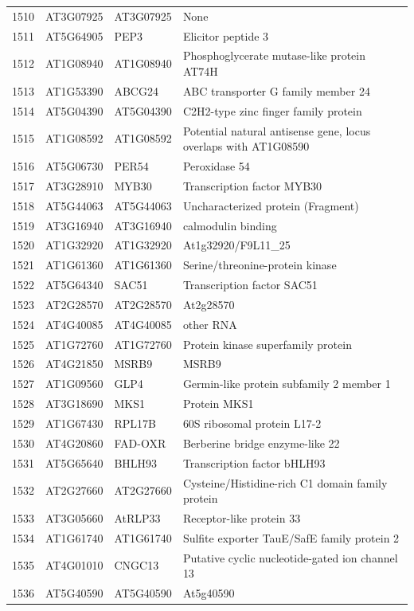 \documentclass[11pt]{article}
\begin{document}
\begin{center}
\begin{tabular}{rlll}
1510 & AT3G07925 & AT3G07925 & None\\
1511 & AT5G64905 & PEP3 & Elicitor peptide 3\\
1512 & AT1G08940 & AT1G08940 & Phosphoglycerate mutase-like protein AT74H\\
1513 & AT1G53390 & ABCG24 & ABC transporter G family member 24\\
1514 & AT5G04390 & AT5G04390 & C2H2-type zinc finger family protein\\
1515 & AT1G08592 & AT1G08592 & Potential natural antisense gene, locus overlaps with AT1G08590\\
1516 & AT5G06730 & PER54 & Peroxidase 54\\
1517 & AT3G28910 & MYB30 & Transcription factor MYB30\\
1518 & AT5G44063 & AT5G44063 & Uncharacterized protein (Fragment)\\
1519 & AT3G16940 & AT3G16940 & calmodulin binding\\
1520 & AT1G32920 & AT1G32920 & At1g32920/F9L11\_25\\
1521 & AT1G61360 & AT1G61360 & Serine/threonine-protein kinase\\
1522 & AT5G64340 & SAC51 & Transcription factor SAC51\\
1523 & AT2G28570 & AT2G28570 & At2g28570\\
1524 & AT4G40085 & AT4G40085 & other RNA\\
1525 & AT1G72760 & AT1G72760 & Protein kinase superfamily protein\\
1526 & AT4G21850 & MSRB9 & MSRB9\\
1527 & AT1G09560 & GLP4 & Germin-like protein subfamily 2 member 1\\
1528 & AT3G18690 & MKS1 & Protein MKS1\\
1529 & AT1G67430 & RPL17B & 60S ribosomal protein L17-2\\
1530 & AT4G20860 & FAD-OXR & Berberine bridge enzyme-like 22\\
1531 & AT5G65640 & BHLH93 & Transcription factor bHLH93\\
1532 & AT2G27660 & AT2G27660 & Cysteine/Histidine-rich C1 domain family protein\\
1533 & AT3G05660 & AtRLP33 & Receptor-like protein 33\\
1534 & AT1G61740 & AT1G61740 & Sulfite exporter TauE/SafE family protein 2\\
1535 & AT4G01010 & CNGC13 & Putative cyclic nucleotide-gated ion channel 13\\
1536 & AT5G40590 & AT5G40590 & At5g40590\\

\end{tabular}
\end{center}
\end{document}
